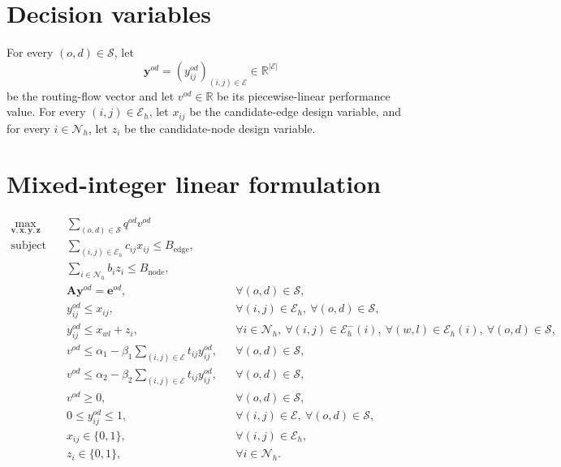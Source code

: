\documentclass{article}
\begin{document}
\section*{Decision variables}
For every \((o,d)\in\mathcal S\), let
\[
\mathbf y^{od}=(y_{ij}^{od})_{(i,j)\in\mathcal E}\in\mathbb R^{|\mathcal E|}
\]
be the routing-flow vector and let \(v^{od}\in\mathbb R\) be its piecewise-linear performance value. For every \((i,j)\in\mathcal E_h\), let \(x_{ij}\) be the candidate-edge design variable, and for every \(i\in\mathcal N_h\), let \(z_i\) be the candidate-node design variable.

\section*{Mixed-integer linear formulation}
\begin{align}
\max_{\mathbf v,\mathbf x,\mathbf y,\mathbf z}\quad
& \sum_{(o,d)\in\mathcal S}q^{od}v^{od} \label{obj}\\
\text{subject to}\quad
& \sum_{(i,j)\in\mathcal E_h}c_{ij}x_{ij}
  \leq B_{\mathrm{edge}}, \label{edge-budget}\\
& \sum_{i\in\mathcal N_h}b_i z_i
  \leq B_{\mathrm{node}}, \label{node-budget}\\
& \mathbf A\mathbf y^{od}=\mathbf e^{od},
  && \forall (o,d)\in\mathcal S, \label{flow-balance}\\
& y_{ij}^{od}\leq x_{ij},
  && \forall (i,j)\in\mathcal E_h,\ \forall (o,d)\in\mathcal S, \label{edge-linking}\\
& y_{ij}^{od}\leq x_{wl}+z_i,
  && \forall i\in\mathcal N_h,\ \forall (i,j)\in\mathcal E_h^{-}(i),
     \ \forall (w,l)\in\mathcal E_h(i),\ \forall (o,d)\in\mathcal S, \label{node-linking}\\
& v^{od}\leq \alpha_1-\beta_1\sum_{(i,j)\in\mathcal E}t_{ij}y_{ij}^{od},
  && \forall (o,d)\in\mathcal S, \label{piece-one}\\
& v^{od}\leq \alpha_2-\beta_2\sum_{(i,j)\in\mathcal E}t_{ij}y_{ij}^{od},
  && \forall (o,d)\in\mathcal S, \label{piece-two}\\
& v^{od}\geq 0,
  && \forall (o,d)\in\mathcal S, \label{value-domain}\\
& 0\leq y_{ij}^{od}\leq 1,
  && \forall (i,j)\in\mathcal E,\ \forall (o,d)\in\mathcal S, \label{flow-domain}\\
& x_{ij}\in\{0,1\},
  && \forall (i,j)\in\mathcal E_h, \label{edge-domain}\\
& z_i\in\{0,1\},
  && \forall i\in\mathcal N_h. \label{node-domain}
\end{align}
\end{document}
